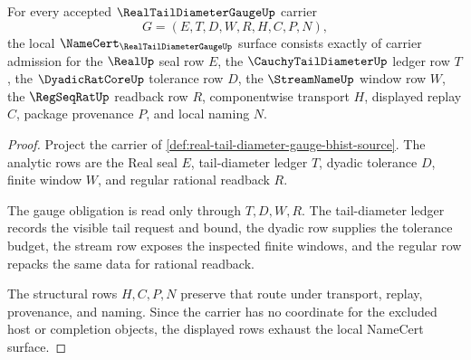 \begin{theorem}
\label{thm:real-tail-diameter-gauge-namecert-obligation-surface}
For every accepted $\RealTailDiameterGaugeUp$ carrier
$$
G=(E,T,D,W,R,H,C,P,N),
$$
the local $\NameCert_{\RealTailDiameterGaugeUp}$ surface consists exactly of carrier admission for the $\RealUp$ seal row $E$, the $\CauchyTailDiameterUp$ ledger row $T$, the $\DyadicRatCoreUp$ tolerance row $D$, the $\StreamNameUp$ window row $W$, the $\RegSeqRatUp$ readback row $R$, componentwise transport $H$, displayed replay $C$, package provenance $P$, and local naming $N$.
\end{theorem}
\begin{proof}
Project the carrier of \autoref{def:real-tail-diameter-gauge-bhist-source}. The analytic rows are the Real seal $E$, tail-diameter ledger $T$, dyadic tolerance $D$, finite window $W$, and regular rational readback $R$.

The gauge obligation is read only through $T,D,W,R$. The tail-diameter ledger records the visible tail request and bound, the dyadic row supplies the tolerance budget, the stream row exposes the inspected finite windows, and the regular row repacks the same data for rational readback.

The structural rows $H,C,P,N$ preserve that route under transport, replay, provenance, and naming. Since the carrier has no coordinate for the excluded host or completion objects, the displayed rows exhaust the local NameCert surface.
\end{proof}

